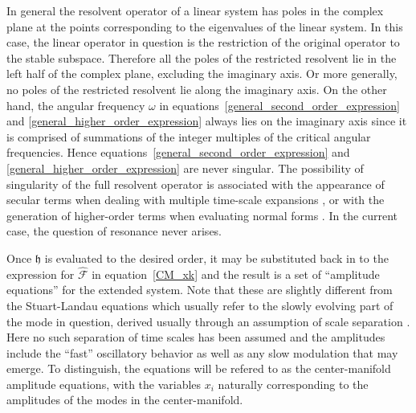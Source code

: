 In general the resolvent operator of a linear system has poles in the complex plane at the points corresponding to the eigenvalues of the linear system. In this case, the linear operator in question is the restriction of the original operator to the stable subspace. Therefore all the poles of the restricted resolvent lie in the left half of the complex plane, excluding the imaginary axis. Or more generally, no poles of the restricted resolvent lie along the imaginary axis. On the other hand, the angular frequency $\omega$ in equations~\eqref{general_second_order_expression} and \eqref{general_higher_order_expression} always lies on the imaginary axis since it is comprised of summations of the integer multiples of the critical angular frequencies. Hence equations~\eqref{general_second_order_expression} and \eqref{general_higher_order_expression} are never singular. The possibility of singularity of the full resolvent operator is associated with the appearance of secular terms when dealing with multiple time-scale expansions \citep{bender99}, or with the generation of higher-order terms when evaluating normal forms \citep{wiggins03,guckenheimer83,coullet83,haragus11,carini15}. In the current case, the question of resonance never arises.

Once $\mathfrak{h}$ is evaluated to the desired order, it may be substituted back in to the expression for $\mathcal{\widehat{F}}$ in equation~\eqref{CM_xk} and the result is a set of ``amplitude equations'' for the extended system. Note that these are slightly different from the Stuart-Landau equations which usually refer to the slowly evolving part of the mode in question, derived usually through an assumption of scale separation \citep{newell69,cross09,sipp07}. Here no such separation of time scales has been assumed and the amplitudes include the ``fast'' oscillatory behavior as well as any slow modulation that may emerge. To distinguish, the equations will be refered to as the center-manifold amplitude equations, with the variables $x_{i}$ naturally corresponding to the amplitudes of the modes in the center-manifold. 

